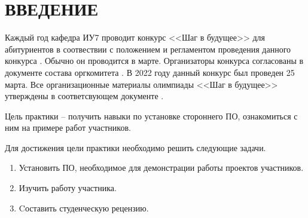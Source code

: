 \chapter*{ВВЕДЕНИЕ}

Каждый год кафедра ИУ7 проводит конкурс <<Шаг в будущее>> для абитуриентов в соотвествии с положением и регламентом проведения данного конкурса \cite{step1, step2}. Обычно он проводится в марте. Организаторы конкурса согласованы в документе состава оргкомитета \cite{step3}.
В 2022 году данный конкурс был проведен 25 марта.
Все организационные материалы олимпиады <<Шаг в будущее>> утверждены в соответсвующем документе \cite{step5}.

Цель практики -- получить навыки по установке стороннего ПО, ознакомиться с ним на примере работ участников.

Для достижения цели практики необходимо решить следующие задачи.

\begin{enumerate}
    \item Установить ПО, необходимое для демонстрации работы проектов участников.
    \item Изучить работу участника.
    \item Cоставить студенческую рецензию.
\end{enumerate}
